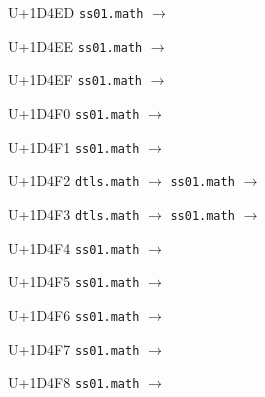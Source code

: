 \documentclass{article}
\begin{document}
\begin{substitutions}
\goodbreak

U+1D4ED  \linebreak
    \texttt{ss01.math} $\to$  

\goodbreak

U+1D4EE  \linebreak
    \texttt{ss01.math} $\to$  

\goodbreak

U+1D4EF  \linebreak
    \texttt{ss01.math} $\to$  

\goodbreak

U+1D4F0  \linebreak
    \texttt{ss01.math} $\to$  

\goodbreak

U+1D4F1  \linebreak
    \texttt{ss01.math} $\to$  

\goodbreak

U+1D4F2  \linebreak
    \texttt{dtls.math} $\to$  \linebreak
    \texttt{ss01.math} $\to$  

\goodbreak

U+1D4F3  \linebreak
    \texttt{dtls.math} $\to$  \linebreak
    \texttt{ss01.math} $\to$  

\goodbreak

U+1D4F4  \linebreak
    \texttt{ss01.math} $\to$  

\goodbreak

U+1D4F5  \linebreak
    \texttt{ss01.math} $\to$  

\goodbreak

U+1D4F6  \linebreak
    \texttt{ss01.math} $\to$  

\goodbreak

U+1D4F7  \linebreak
    \texttt{ss01.math} $\to$  

\goodbreak

U+1D4F8  \linebreak
    \texttt{ss01.math} $\to$  


\end{substitutions}
\end{document}
